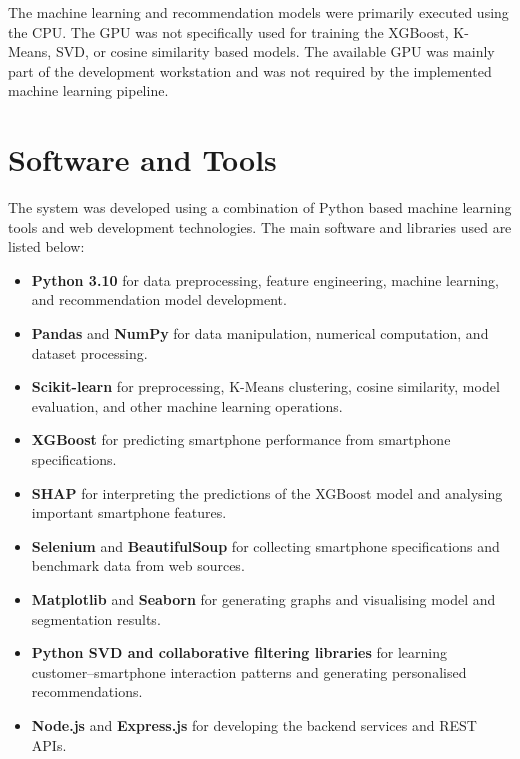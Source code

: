 \documentclass[12pt]{report}
\numberwithin{figure}{chapter}
\numberwithin{table}{chapter}
\numberwithin{equation}{chapter}
\begin{document}
The machine learning and recommendation models were primarily executed using the CPU. The GPU was not specifically used for training the XGBoost, K-Means, SVD, or cosine similarity based models. The available GPU was mainly part of the development workstation and was not required by the implemented machine learning pipeline.

\section{Software and Tools}

The system was developed using a combination of Python based machine learning tools and web development technologies. The main software and libraries used are listed below:

\begin{itemize}
    \item \textbf{Python 3.10} for data preprocessing, feature engineering, machine learning, and recommendation model development.
    
    \item \textbf{Pandas} and \textbf{NumPy} for data manipulation, numerical computation, and dataset processing.
    
    \item \textbf{Scikit-learn} for preprocessing, K-Means clustering, cosine similarity, model evaluation, and other machine learning operations.
    
    \item \textbf{XGBoost} for predicting smartphone performance from smartphone specifications.
    
    \item \textbf{SHAP} for interpreting the predictions of the XGBoost model and analysing important smartphone features.
    
    \item \textbf{Selenium} and \textbf{BeautifulSoup} for collecting smartphone specifications and benchmark data from web sources.
    
    \item \textbf{Matplotlib} and \textbf{Seaborn} for generating graphs and visualising model and segmentation results.
    
    \item \textbf{Python SVD and collaborative filtering libraries} for learning customer--smartphone interaction patterns and generating personalised recommendations.
    
    \item \textbf{Node.js} and \textbf{Express.js} for developing the backend services and REST APIs.
    

\end{itemize}
\end{document}
